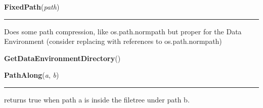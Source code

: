     \label{System:Utils:FixedPath}

    \vspace{0.5ex}

\hspace{.8\funcindent}\begin{boxedminipage}{\funcwidth}

    \raggedright \textbf{FixedPath}(\textit{path})

    \vspace{-1.5ex}

    \rule{\textwidth}{0.5\fboxrule}
\setlength{\parskip}{2ex}
    Does some path compression, like os.path.normpath but proper for the 
    Data Environment (consider replacing with references to 
    os.path.normpath)

\setlength{\parskip}{1ex}
    \end{boxedminipage}

    \label{System:Utils:GetDataEnvironmentDirectory}

    \vspace{0.5ex}

\hspace{.8\funcindent}\begin{boxedminipage}{\funcwidth}

    \raggedright \textbf{GetDataEnvironmentDirectory}()

\setlength{\parskip}{2ex}
\setlength{\parskip}{1ex}
    \end{boxedminipage}

    \label{System:Utils:PathAlong}

    \vspace{0.5ex}

\hspace{.8\funcindent}\begin{boxedminipage}{\funcwidth}

    \raggedright \textbf{PathAlong}(\textit{a}, \textit{b})

    \vspace{-1.5ex}

    \rule{\textwidth}{0.5\fboxrule}
\setlength{\parskip}{2ex}
    returns true when path a is inside the filetree under path b.

\setlength{\parskip}{1ex}
    \end{boxedminipage}

